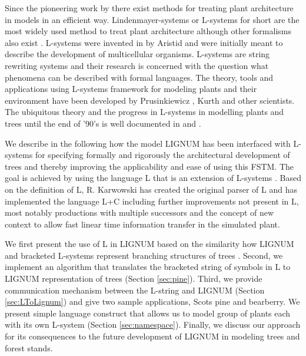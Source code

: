 Since the pioneering work  by \citet{honda:71} there exist methods for
treating   plant  architecture   in  models   in  an   efficient  way.
Lindenmayer-systems or L-systems for  short \citep{pp:89} are the most
widely  used  method  to   treat  plant  architecture  although  other
formalisms   also  exist \citep[e.g.][]{dereffye:97,   godin:99}.
L-systems   were  invented   in   by  Aristid   \citet{lindenmayer:68,
  lindenmayer:71} and were initially meant to describe the development
of  multicellular organisms.  L-systems  are string  rewriting systems
and their research  is concerned with the question  what phenomena can
be   described  with   formal  languages.    The  theory,   tools  and
applications using  L-systems framework for modeling  plants and their
environment have been  developed by Prusinkiewicz \citep{pp:89,pp:92},
Kurth  \citep{kurth:94} and other  scientists.  The  ubiquitous theory
and the progress in L-systems  in modelling plants and trees until the
end   of  '90's   is  well   documented  in   \citet{pp:90,pp:99}  and
\citet{kurth:99}.

We describe in the following  how the model LIGNUM has been interfaced
with   L-systems   for   specifying   formally  and   rigorously   the
architectural   development  of  trees   and  thereby   improving  the
applicability and  ease of using this  FSTM.  The goal  is achieved by
using the language L that  is an extension of L-systems \citep{pp:99a}.
Based on the definition of  L, R.  Karwowski has created the original
parser of L and  has implemented the language L+C \citep{karwowski:02}
including  further  improvements  not   present  in  L,  most  notably
productions with multiple successors and the concept of new context
\citep{karwowski:03} to allow fast linear time information transfer in
the simulated plant.

We first  present the use of L  in LIGNUM based on  the similarity how
LIGNUM and bracketed L-systems represent branching structures of trees
\citep{perttunen:96, perttunen:01}.  Second, we implement an algorithm
that  translates  the bracketed  string  of  symbols  in L  to  LIGNUM
representation of  trees (Section \ref{sec:pine}).   Third, we provide
communication  mechanism  between  the  L-string and  LIGNUM  (Section
\ref{sec:LToLignum}) and give two  sample applications, Scots pine and
bearberry.   We present simple  language construct  that allows  us to
model   group  of  plants   each  with   its  own   L-system  (Section
\ref{sec:namespace}).   Finally,  we  discuss  our  approach  for  its
consequences to the future development of LIGNUM in modeling trees and
forest stands.

